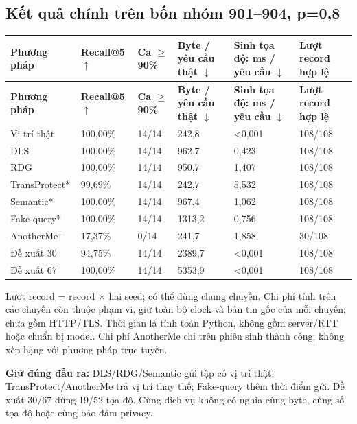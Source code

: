 \documentclass[10pt,a4paper]{article}
\begin{document}
\subsection{Kết quả chính trên bốn nhóm 901–904, p=0,8}
\begingroup\small
\begin{longtable}{@{}P{3.469cm}P{2.282cm}P{1.643cm}P{2.921cm}P{3.104cm}P{2.374cm}@{}}
\toprule
\textbf{Phương pháp} & \textbf{Recall@5 $\uparrow$} & \textbf{Ca $\ge$90\%} & \textbf{Byte / yêu cầu thật $\downarrow$} & \textbf{Sinh tọa độ: ms / yêu cầu $\downarrow$} & \textbf{Lượt record hợp lệ}\\\midrule
\endfirsthead
\toprule
\textbf{Phương pháp} & \textbf{Recall@5 $\uparrow$} & \textbf{Ca $\ge$90\%} & \textbf{Byte / yêu cầu thật $\downarrow$} & \textbf{Sinh tọa độ: ms / yêu cầu $\downarrow$} & \textbf{Lượt record hợp lệ}\\\midrule
\endhead
\bottomrule\endfoot
Vị trí thật & 100,00\% & 14/14 & 242,8 & <0,001 & 108/108\\
\addlinespace[3pt]
DLS & 100,00\% & 14/14 & 962,7 & 0,423 & 108/108\\
\addlinespace[3pt]
RDG & 100,00\% & 14/14 & 950,7 & 1,407 & 108/108\\
\addlinespace[3pt]
TransProtect* & 99,69\% & 14/14 & 242,7 & 5,532 & 108/108\\
\addlinespace[3pt]
Semantic* & 100,00\% & 14/14 & 967,4 & 1,062 & 108/108\\
\addlinespace[3pt]
Fake-query* & 100,00\% & 14/14 & 1313,2 & 0,756 & 108/108\\
\addlinespace[3pt]
AnotherMe† & 17,37\% & 0/14 & 241,7 & 1,858 & 30/108\\
\addlinespace[3pt]
Đề xuất 30 & 94,75\% & 14/14 & 2389,7 & <0,001 & 108/108\\
\addlinespace[3pt]
Đề xuất 67 & 100,00\% & 14/14 & 5353,9 & <0,001 & 108/108\\
\end{longtable}
\endgroup
Lượt record = record $\times$ hai seed; có thể dùng chung chuyến. Chi phí tính trên các chuyến còn thuộc phạm vi, giữ toàn bộ clock và bản tin gốc của mỗi chuyến; chưa gồm HTTP/TLS. Thời gian là tính toán Python, không gồm server/RTT hoặc chuẩn bị model. Chi phí AnotherMe chỉ trên phiên sinh thành công; không xếp hạng với phương pháp trực tuyến.

\textbf{Giữ đúng đầu ra:} DLS/RDG/Semantic gửi tập có vị trí thật; TransProtect/AnotherMe trả vị trí thay thế; Fake-query thêm thời điểm gửi. Đề xuất 30/67 dùng 19/52 tọa độ. Cùng dịch vụ không có nghĩa cùng byte, cùng số tọa độ hoặc cùng bảo đảm privacy.
\end{document}

